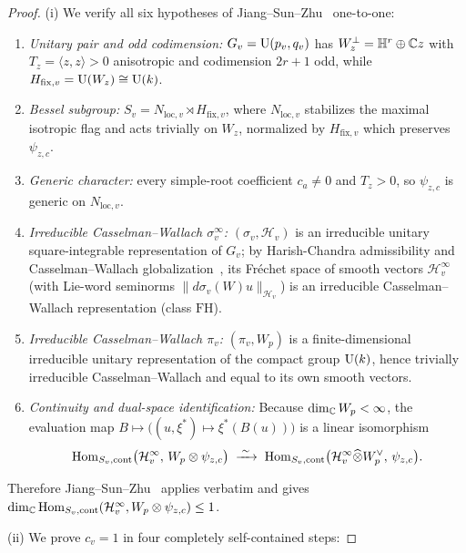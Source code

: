 \begin{proof}
(i) We verify all six hypotheses of Jiang--Sun--Zhu~\cite[Theorem~A]{JiangSunZhu2010} one-to-one:
\begin{enumerate}[label=\textup{\arabic*.}]
\item \emph{Unitary pair and odd codimension:} $G_v = \mathrm{U}(p_v, q_v)$ has $W_z^\perp = \mathbb{H}^r \oplus \mathbb{C} z$ with $T_z = \langle z, z \rangle > 0$ anisotropic and codimension $2r + 1$ odd, while $H_{\mathrm{fix}, v} = \mathrm{U}(W_z) \cong \mathrm{U}(k)$.
\item \emph{Bessel subgroup:} $S_v = N_{\mathrm{loc}, v} \rtimes H_{\mathrm{fix}, v}$, where $N_{\mathrm{loc}, v}$ stabilizes the maximal isotropic flag and acts trivially on $W_z$, normalized by $H_{\mathrm{fix}, v}$ which preserves $\psi_{z, c}$.
\item \emph{Generic character:} every simple-root coefficient $c_a \neq 0$ and $T_z > 0$, so $\psi_{z, c}$ is generic on $N_{\mathrm{loc}, v}$.
\item \emph{Irreducible Casselman--Wallach $\sigma_v^\infty$:} $(\sigma_v, \mathcal{H}_v)$ is an irreducible unitary square-integrable representation of $G_v$; by Harish-Chandra admissibility and Casselman--Wallach globalization~\cite{Wallach1988}, its Fr\'echet space of smooth vectors $\mathcal{H}_v^\infty$ (with Lie-word seminorms $\|d\sigma_v(W) u\|_{\mathcal{H}_v}$) is an irreducible Casselman--Wallach representation (class $\mathrm{FH}$).
\item \emph{Irreducible Casselman--Wallach $\pi_v$:} $(\pi_v, W_p)$ is a finite-dimensional irreducible unitary representation of the compact group $\mathrm{U}(k)$, hence trivially irreducible Casselman--Wallach and equal to its own smooth vectors.
\item \emph{Continuity and dual-space identification:} Because $\dim_{\mathbb{C}} W_p < \infty$, the evaluation map $B \mapsto \bigl((u, \xi^*) \mapsto \xi^*(B(u))\bigr)$ is a linear isomorphism
  \[
    \mathrm{Hom}_{S_v, \mathrm{cont}}\bigl(\mathcal{H}_v^\infty,\, W_p \otimes \psi_{z,c}\bigr)
    \;\xrightarrow{\;\sim\;}\;
    \mathrm{Hom}_{S_v, \mathrm{cont}}\bigl(\mathcal{H}_v^\infty \widehat{\otimes} W_p^\vee,\, \psi_{z,c}\bigr).
  \]
\end{enumerate}
Therefore Jiang--Sun--Zhu~\cite[Theorem~A]{JiangSunZhu2010} applies verbatim and gives $\dim_{\mathbb{C}} \mathrm{Hom}_{S_v, \mathrm{cont}}(\mathcal{H}_v^\infty, W_p \otimes \psi_{z,c}) \le 1$.

(ii) We prove $c_v = 1$ in four completely self-contained steps:


\end{proof}
